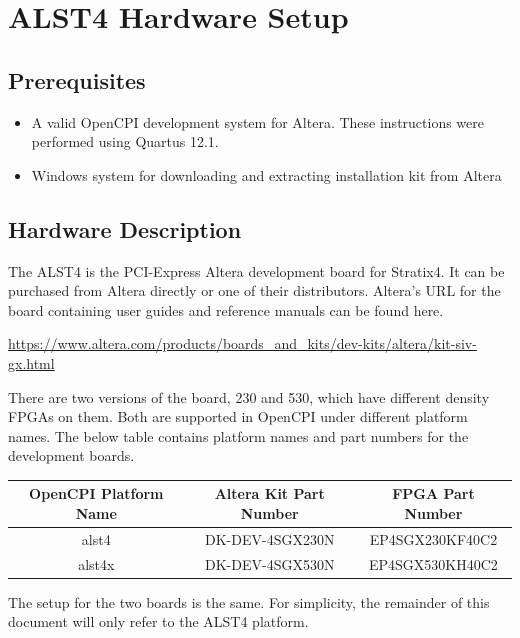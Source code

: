 \documentclass{article}
\begin{document}
\section*{ALST4 Hardware Setup}
\subsection*{Prerequisites}
\begin{itemize}
\item A valid OpenCPI development system for Altera. These instructions were performed using Quartus 12.1.
\item Windows system for downloading and extracting installation kit from Altera
\end{itemize}
\subsection*{Hardware Description}
 The ALST4 is the PCI-Express Altera development board for Stratix4. It can be purchased from Altera directly or one of their distributors. Altera's URL for the board containing user guides and reference manuals can be found here.\par\bigskip
​\url{https://www.altera.com/products/boards\_and\_kits/dev-kits/altera/kit-siv-gx.html}\par\bigskip
\noindent There are two versions of the board, 230 and 530, which have different density FPGAs on them. Both are supported in OpenCPI under different platform names. The below table contains platform names and part numbers for the development boards.\par\smallskip
\begin{tabular}{|c|c|c|}
\hline
\rowcolor{blue}
OpenCPI Platform Name & Altera Kit Part Number & FPGA Part Number \\
\hline
alst4 &  DK-DEV-4SGX230N & EP4SGX230KF40C2 \\
\hline
alst4x &  DK-DEV-4SGX530N & EP4SGX530KH40C2 \\
\hline
\end{tabular}\par\bigskip
\noindent The setup for the two boards is the same. For simplicity, the remainder of this document will only refer to the ALST4 platform.
\end{document}
